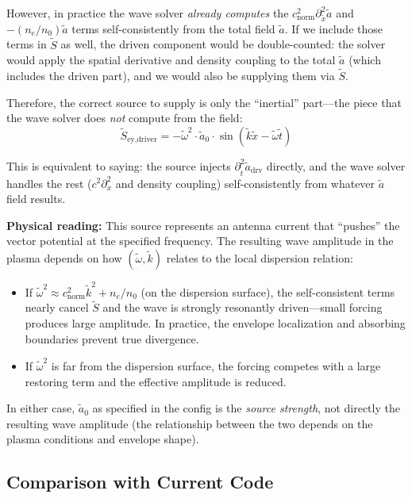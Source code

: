 \documentclass[11pt]{article}
\newcommand{\tl}[1]{\tilde{#1}}
\newcommand{\cnorm}{c_{\text{norm}}}
\begin{document}
However, in practice the wave solver \emph{already computes} the $\cnorm^2\partial^2_{\tl{x}}\tl{a}$ and $-(n_e/n_0)\tl{a}$ terms self-consistently from the total field $\tl{a}$. If we include those terms in $\tl{S}$ as well, the driven component would be double-counted: the solver would apply the spatial derivative and density coupling to the total $\tl{a}$ (which includes the driven part), and we would also be supplying them via $\tl{S}$.

Therefore, the correct source to supply is only the ``inertial'' part---the piece that the wave solver does \emph{not} compute from the field:
\begin{equation}
    \boxed{
    \tl{S}_{\text{ey,driver}} = -\tl{\omega}^2 \cdot \tl{a}_0 \cdot \sin(\tl{k}\tl{x} - \tl{\omega}\tl{t})
    }
    \label{eq:ey-driver}
\end{equation}

This is equivalent to saying: the source injects $\partial^2_{\tl{t}} \tl{a}_{\text{drv}}$ directly, and the wave solver handles the rest ($c^2\partial^2_x$ and density coupling) self-consistently from whatever $\tl{a}$ field results.

\textbf{Physical reading:} This source represents an antenna current that ``pushes'' the vector potential at the specified frequency. The resulting wave amplitude in the plasma depends on how $(\tl\omega, \tl{k})$ relates to the local dispersion relation:
\begin{itemize}
    \item If $\tl{\omega}^2 \approx \cnorm^2\tl{k}^2 + n_e/n_0$ (on the dispersion surface), the self-consistent terms nearly cancel $\tl{S}$ and the wave is strongly resonantly driven---small forcing produces large amplitude. In practice, the envelope localization and absorbing boundaries prevent true divergence.
    \item If $\tl{\omega}^2$ is far from the dispersion surface, the forcing competes with a large restoring term and the effective amplitude is reduced.
\end{itemize}

In either case, $\tl{a}_0$ as specified in the config is the \emph{source strength}, not directly the resulting wave amplitude (the relationship between the two depends on the plasma conditions and envelope shape).

\subsection{Comparison with Current Code}
\end{document}
